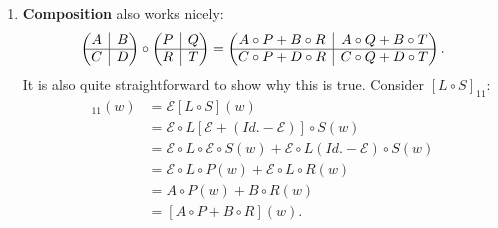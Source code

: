 \documentclass{article}
\theoremstyle{definition}
\newcommand{\E}{\mathcal{E}}
\newcommand{\rvline}{\hspace*{-\arraycolsep}\vline\hspace*{-\arraycolsep}}
\begin{document}
\begin{enumerate}
	
	\item \textbf{Composition} also works nicely:
	\begin{align}
	\begin{pmatrix}
	A & \rvline & B\\
	\hline
	C & \rvline & D
	\end{pmatrix} \circ \begin{pmatrix}
	P & \rvline & Q\\
	\hline
	R & \rvline & T
	\end{pmatrix} 
	=
	\begin{pmatrix}
	A\circ P + B \circ R & \rvline & A \circ Q + B \circ T \\
	\hline
	C \circ P + D \circ R & \rvline & C \circ Q + D \circ T
	\end{pmatrix} .
	\end{align}
	It is also quite straightforward to show why this is true. Consider $[L\circ S]_{11}$:
	\begin{align*}
	[L\circ S]_{11}(w) &= \E[L\circ S](w)\\
	&= \E \circ L[\E + (Id. - \E)]\circ S(w)\\
	&= \E \circ L \circ \E \circ S(w) + \E \circ L (Id. - \E) \circ S(w)\\
	&= \E \circ L \circ P(w) + \E \circ L \circ R(w)\\
	&= A\circ P(w)  +  B \circ R(w)\\
	&= [A\circ P + B \circ R](w).
	\end{align*}
	

\end{enumerate}
\end{document}
